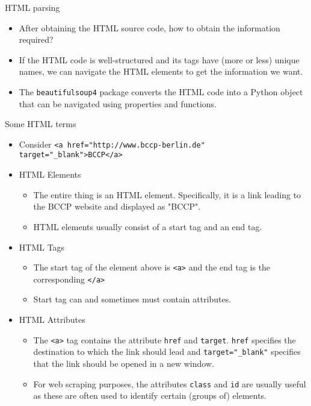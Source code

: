 \begin{frame}{HTML parsing}
\begin{itemize}
	\item After obtaining the HTML source code, how to obtain the information required?
	\item If the HTML code is well-structured and its tags have (more or less) unique names, we can navigate the HTML elements to get the information we want.
	\item The \texttt{beautifulsoup4} package converts the HTML code into a Python object that can be navigated using properties and functions.
\end{itemize}
\end{frame}

\begin{frame}[fragile]{Some HTML terms}
\begin{itemize}
	\item Consider \texttt{<a href="http://www.bccp-berlin.de" target="_blank">BCCP</a>}	 
	\item HTML Elements
	\begin{itemize}
		\item The entire thing is an HTML element. Specifically, it is a link leading to the BCCP website and displayed as "BCCP".
		\item HTML elements usually consist of a start tag and an end tag.
	\end{itemize}
	\item HTML Tags
	\begin{itemize}
		\item The start tag of the element above is  \texttt{<a>} and the end tag is the corresponding  \texttt{</a>}
		\item Start tag can and sometimes must contain attributes.
	\end{itemize}
	\item HTML Attributes
	\begin{itemize}
		\item The  \texttt{<a>} tag contains the attribute  \texttt{href} and  \texttt{target}.  \texttt{href} specifies the destination to which the link should lead and  \texttt{target="\_blank"} specifies that the link should be opened in a new window.
		\item For web scraping purposes, the attributes  \texttt{class} and  \texttt{id} are usually useful as these are often used to identify certain (groups of) elements.
	\end{itemize}
\end{itemize}
\end{frame}

